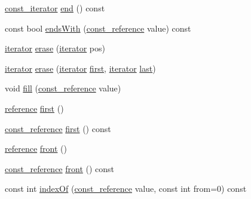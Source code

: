 \begin{DoxyCompactItemize}
\item 
\hyperlink{classprism_1_1_deque_a264ab74c18a153ed1d225cb7b29d8f17}{const\+\_\+iterator} \hyperlink{classprism_1_1_deque_a70e4dd36f2946a18dfb261edf0d989d9}{end} () const 
\item 
const bool \hyperlink{classprism_1_1_deque_a4b0b64d24b0c8920edc0507d57e9f75f}{ends\+With} (\hyperlink{classprism_1_1_deque_affa26df70d5123f79a59386056e920c3}{const\+\_\+reference} value) const 
\item 
\hyperlink{classprism_1_1_deque_a263fd8daf307719cd101c97028fe68a1}{iterator} \hyperlink{classprism_1_1_deque_aebfefa05dfd3e23ddd57b2134dce14ab}{erase} (\hyperlink{classprism_1_1_deque_a263fd8daf307719cd101c97028fe68a1}{iterator} pos)
\item 
\hyperlink{classprism_1_1_deque_a263fd8daf307719cd101c97028fe68a1}{iterator} \hyperlink{classprism_1_1_deque_a60dd9d124f6fc1f0ab521b4a7829028f}{erase} (\hyperlink{classprism_1_1_deque_a263fd8daf307719cd101c97028fe68a1}{iterator} \hyperlink{classprism_1_1_deque_ab33aa2e2ebb794b5a9beabee1b41c8f1}{first}, \hyperlink{classprism_1_1_deque_a263fd8daf307719cd101c97028fe68a1}{iterator} \hyperlink{classprism_1_1_deque_a2ee25a04680e547ae11c165a087e6806}{last})
\item 
void \hyperlink{classprism_1_1_deque_a09750fd8b4c0d6ecaa911ae9aac64d43}{fill} (\hyperlink{classprism_1_1_deque_affa26df70d5123f79a59386056e920c3}{const\+\_\+reference} value)
\item 
\hyperlink{classprism_1_1_deque_a035cdb869f46870d62d403d9ff5e3691}{reference} \hyperlink{classprism_1_1_deque_ab33aa2e2ebb794b5a9beabee1b41c8f1}{first} ()
\item 
\hyperlink{classprism_1_1_deque_affa26df70d5123f79a59386056e920c3}{const\+\_\+reference} \hyperlink{classprism_1_1_deque_af93b742eda49f83ae4c5b9480ac45214}{first} () const 
\item 
\hyperlink{classprism_1_1_deque_a035cdb869f46870d62d403d9ff5e3691}{reference} \hyperlink{classprism_1_1_deque_ad6e4e77cbb62109dd2f9f4afd1d3e26e}{front} ()
\item 
\hyperlink{classprism_1_1_deque_affa26df70d5123f79a59386056e920c3}{const\+\_\+reference} \hyperlink{classprism_1_1_deque_afc8bc5fd39fee04d64668d719aec19fe}{front} () const 
\item 
const int \hyperlink{classprism_1_1_deque_af4b6296452ceef1bc946a22f6eb56daa}{index\+Of} (\hyperlink{classprism_1_1_deque_affa26df70d5123f79a59386056e920c3}{const\+\_\+reference} value, const int from=0) const 
\item 

\end{DoxyCompactItemize}

